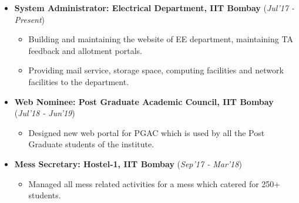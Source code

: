 \documentclass[10pt]{article}
\begin{document}
\begin{itemize}[leftmargin=0.4cm]
\vspace{-0.2cm}
\item \textbf {System Administrator: Electrical Department, IIT Bombay} 
\hfill{(\textit{Jul'17 - Present})}\\[-0.6cm]
    \begin{itemize}
	\item Building and maintaining the website of EE department, maintaining TA feedback and allotment portals.\vspace{-0.1cm}
	\item Providing mail service, storage space, computing facilities and network facilities to the department.\vspace{-0.1cm}

	\end{itemize}
	\vspace{-0.25cm}
	
	
\item \textbf{Web Nominee: Post Graduate Academic Council, IIT Bombay}
\hfill{(\textit{Jul'18 - Jun'19})}\\[-0.65cm]
    \begin{itemize}
			\item Designed new web portal for PGAC which is used by all the Post Graduate students of the institute. \vspace{-0.1cm}
		
		\end{itemize}
		\vspace{-0.25cm}

\item \textbf{Mess Secretary: Hostel-1, IIT Bombay}
\hfill{(\textit{Sep'17 - Mar'18})}\\[-0.65cm]
    \begin{itemize}
            \item Managed all mess related activities for a mess which catered for 250+ students. \vspace{-0.1cm}

		\end{itemize}
		\vspace{-0.2cm}	
   	
\end{itemize}
\vspace{0.05cm}
\end{document}
